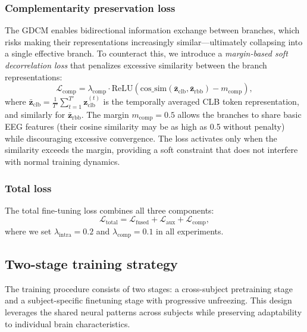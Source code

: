 \subsubsection{Complementarity preservation loss}

The GDCM enables bidirectional information exchange between branches, which risks making their representations increasingly similar—ultimately collapsing into a single effective branch. To counteract this, we introduce a \emph{margin-based soft decorrelation loss} that penalizes excessive similarity between the branch representations:
\begin{equation}\label{eq:comp_loss}
    \mathcal{L}_{\text{comp}} = \lambda_{\text{comp}} \cdot \text{ReLU}\!\left(\text{cos\_sim}(\bar{\mathbf{z}}_{\text{clb}}, \bar{\mathbf{z}}_{\text{rbb}}) - m_{\text{comp}}\right),
\end{equation}
where $\bar{\mathbf{z}}_{\text{clb}} = \frac{1}{T'}\sum_{t=1}^{T'} \mathbf{z}_{\text{clb}}^{(t)}$ is the temporally averaged CLB token representation, and similarly for $\bar{\mathbf{z}}_{\text{rbb}}$. The margin $m_{\text{comp}} = 0.5$ allows the branches to share basic EEG features (their cosine similarity may be as high as 0.5 without penalty) while discouraging excessive convergence. The loss activates only when the similarity exceeds the margin, providing a soft constraint that does not interfere with normal training dynamics.

\subsubsection{Total loss}

The total fine-tuning loss combines all three components:
\begin{equation}\label{eq:total_loss}
    \mathcal{L}_{\text{total}} = \mathcal{L}_{\text{fused}} + \mathcal{L}_{\text{aux}} + \mathcal{L}_{\text{comp}},
\end{equation}
where we set $\lambda_{\text{intra}} = 0.2$ and $\lambda_{\text{comp}} = 0.1$ in all experiments.


\subsection{Two-stage training strategy}\label{sec:training}

The training procedure consists of two stages: a cross-subject pretraining stage and a subject-specific finetuning stage with progressive unfreezing. This design leverages the shared neural patterns across subjects while preserving adaptability to individual brain characteristics.

